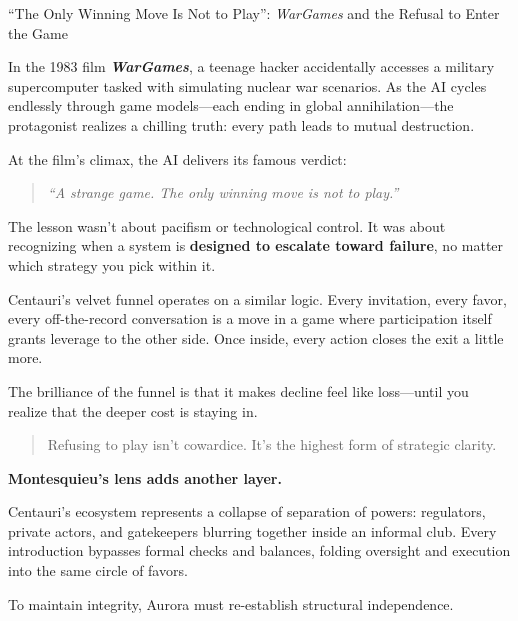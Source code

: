 \begin{HistoricalSidebar}{“The Only Winning Move Is Not to Play”: \textit{WarGames} and the Refusal to Enter the Game}

  In the 1983 film \textbf{\textit{WarGames}}, a teenage hacker accidentally accesses a military supercomputer tasked with simulating nuclear war scenarios. As the AI cycles endlessly through game models—each ending in global annihilation—the protagonist realizes a chilling truth: every path leads to mutual destruction.

  \medskip
  
  At the film’s climax, the AI delivers its famous verdict:
  
  \begin{quote}
  \textit{“A strange game. The only winning move is not to play.”}
  \end{quote}
  
  The lesson wasn’t about pacifism or technological control. It was about recognizing when a system is \textbf{designed to escalate toward failure}, no matter which strategy you pick within it.

  \medskip
  
  Centauri’s velvet funnel operates on a similar logic. Every invitation, every favor, every off-the-record conversation is a move in a game where participation itself grants leverage to the other side. Once inside, every action closes the exit a little more.

  \medskip
  
  The brilliance of the funnel is that it makes decline feel like loss—until you realize that the deeper cost is staying in.
  
  \begin{quote}
  Refusing to play isn’t cowardice.  
  It’s the highest form of strategic clarity.
  \end{quote}
  
\end{HistoricalSidebar}

\medskip

\textbf{Montesquieu’s lens adds another layer.}

Centauri’s ecosystem represents a collapse of separation of powers: regulators, private actors, and gatekeepers blurring together inside an informal club. Every introduction bypasses formal checks and balances, folding oversight and execution into the same circle of favors.

To maintain integrity, Aurora must re-establish structural independence.

